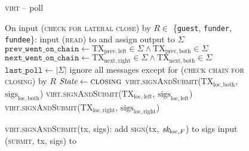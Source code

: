 \begin{figure}[H]
  \begin{processbox}{\textsc{virt} -- poll}
    \begin{algorithmic}[1]
      \State On input (\textsc{check for lateral close}) by $R \in$
      \{\texttt{guest}, \texttt{funder}, \texttt{fundee}\}:
      \Indent
        \State input (\textsc{read}) to \ledger and assign output to $\Sigma$
        \State $\texttt{prev\_went\_on\_chain} \gets \mathrm{TX}_{\mathrm{prev},
        \mathrm{left}} \in \Sigma \wedge \mathrm{TX}_{\mathrm{prev},
        \mathrm{both}} \in \Sigma$
        \State $\texttt{next\_went\_on\_chain} \gets \mathrm{TX}_{\mathrm{next},
        \mathrm{right}} \in \Sigma \wedge \mathrm{TX}_{\mathrm{next},
        \mathrm{both}} \in \Sigma$
        \State $\texttt{last\_poll} \gets |\Sigma|$
          \State ignore all messages except for (\textsc{check chain for
          closing}) by $R$
          \State $\textit{State} \gets \textsc{closing}$
        \EndIf
          \State
          \textsc{virt}.\textsc{signAndSubmit}($\mathrm{TX}_{\mathrm{loc},
          \mathrm{both}}$, $\mathrm{sigs}_{\mathrm{loc}, \mathrm{both}}$)
          \State
          \textsc{virt}.\textsc{signAndSubmit}($\mathrm{TX}_{\mathrm{loc},
          \mathrm{left}}$, $\mathrm{sigs}_{\mathrm{loc}, \mathrm{left}}$)
          \State
          \textsc{virt}.\textsc{signAndSubmit}($\mathrm{TX}_{\mathrm{loc},
          \mathrm{right}}$, $\mathrm{sigs}_{\mathrm{loc}, \mathrm{right}}$)
        \EndIf
      \EndIndent
      \Statex

      \State \textsc{virt}.\textsc{signAndSubmit}(tx, sigs):
      \Indent
        \State add \textsc{sign}(tx, $\textit{sk}_{\mathrm{loc}, F}$) to sigs
        \State input (\textsc{submit}, tx, sigs) to \ledger
      \EndIndent
    \end{algorithmic}
  \end{processbox}
  \caption{}
  \label{code:virtual-layer:poll}
\end{figure}

